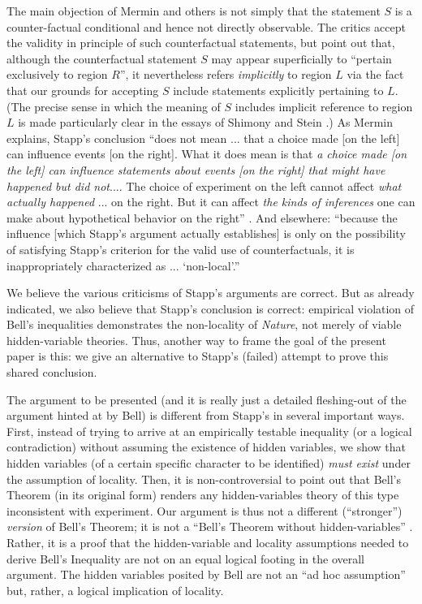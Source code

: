 \documentclass[aps,prc,onecolumn,12pt]{revtex4-2}
\begin{document}
The main objection of Mermin and others is not
simply that the statement $S$ is a counter-factual conditional and
hence not directly observable.  The critics accept the validity in
principle of such counterfactual statements, but point out that,
although the counterfactual statement $S$ may appear superficially to
``pertain exclusively to region $R$'', it nevertheless refers
\emph{implicitly} to region $L$ via the fact that our grounds for
accepting $S$ include statements explicitly pertaining to $L$.
(The precise
sense in which the meaning of $S$ includes implicit
reference to region $L$ is
made particularly clear in the essays of Shimony and
Stein \cite{shimony,shimonystein}.)    As Mermin explains,
Stapp's conclusion ``does not mean ... that a choice
  made [on the left] can influence events [on the right].  What it
  does mean is that \emph{a choice made [on the left] can influence
  statements about events [on the right] that might have happened but
  did not}....  The choice of experiment on the left cannot affect
  \emph{what actually happened} ... on the right.  But it can affect
  \emph{the kinds of inferences} one can make about hypothetical
  behavior on the right'' \cite{mermin}.  And elsewhere:  ``because the
  influence [which Stapp's argument actually establishes] is only on
  the possibility of satisfying Stapp's criterion for the valid use
  of counterfactuals, it is inappropriately characterized as ...
  `non-local'.'' \cite{mermin2}

We believe the various criticisms of Stapp's arguments are correct.
But as already indicated, we also believe that Stapp's conclusion is correct:
empirical violation of
Bell's inequalities demonstrates the non-locality of \emph{Nature}, not
merely of viable hidden-variable theories.  Thus, another way to frame
the goal of the present paper is this:  we give an alternative to
Stapp's (failed) attempt to prove this shared conclusion.

The argument to be presented (and it is really just a detailed
fleshing-out of the argument hinted at by Bell)
is different from Stapp's in several
important ways.  First, instead of trying to arrive at an empirically
testable inequality (or a logical contradiction) without
assuming the existence of hidden
variables, we show that hidden variables (of a certain specific
character to be identified) \emph{must exist} under the assumption of
locality.  Then, it is non-controversial to point out that Bell's
Theorem (in its original form) renders any hidden-variables theory
of this type
inconsistent with experiment.  Our argument is thus not a different
(``stronger'') \emph{version} of Bell's Theorem; it is not a ``Bell's
Theorem without hidden-variables'' \cite{bellwohv}.
Rather, it is a proof that the hidden-variable and locality
assumptions needed to derive Bell's Inequality are not on an equal
logical footing in the overall argument.
The hidden variables posited by Bell are
not an ``ad hoc assumption'' but, rather, a logical implication
of locality.
\end{document}
